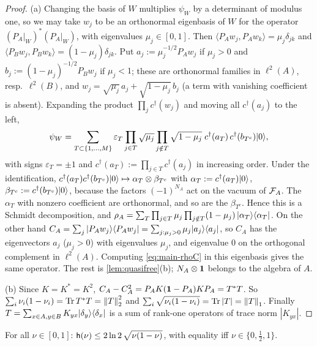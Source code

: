 \begin{proof}
(a) Changing the basis of $W$ multiplies $\psi_W$ by a determinant of modulus one, so we may take $w_j$ to be
an orthonormal eigenbasis of $W$ for the operator $(P_A|_W)^*(P_A|_W)$, with eigenvalues
$\mu_j\in[0,1]$.  Then $\langle P_Aw_j,P_Aw_k\rangle=\mu_j\delta_{jk}$ and
$\langle P_Bw_j,P_Bw_k\rangle=(1-\mu_j)\delta_{jk}$.  Put $a_j:=\mu_j^{-1/2}P_Aw_j$ if $\mu_j>0$ and
$b_j:=(1-\mu_j)^{-1/2}P_Bw_j$ if $\mu_j<1$; these are orthonormal families in $\ell^2(A)$, resp.\ $\ell^2(B)$,
and $w_j=\sqrt{\mu_j}\,a_j+\sqrt{1-\mu_j}\,b_j$ (a term with vanishing coefficient is absent).  Expanding
the product $\prod_jc^\dagger(w_j)$ and moving all $c^\dagger(a_j)$ to the left,
\[
  \psi_W=\sum_{T\subset\{1,\dots,M\}}\varepsilon_T\prod_{j\in T}\sqrt{\mu_j}\prod_{j\notin T}\sqrt{1-\mu_j}\;
  c^\dagger(a_T)\,c^\dagger(b_{T^c})|0\rangle,
\]
with signs $\varepsilon_T=\pm1$ and $c^\dagger(a_T):=\prod_{j\in T}c^\dagger(a_j)$ in increasing order.  Under the
identification, $c^\dagger(a_T)c^\dagger(b_{T^c})|0\rangle\mapsto\alpha_T\otimes\beta_{T^c}$ with
$\alpha_T:=c^\dagger(a_T)|0\rangle$, $\beta_{T^c}:=c^\dagger(b_{T^c})|0\rangle$, because the factors $(-1)^{N_A}$ act on the
vacuum of $\mathcal{F}_A$.  The $\alpha_T$ with nonzero coefficient are orthonormal, and so are the $\beta_{T^c}$.  Hence
this is a Schmidt decomposition, and
$\rho_A=\sum_T\prod_{j\in T}\mu_j\prod_{j\notin T}(1-\mu_j)\,|\alpha_T\rangle\langle \alpha_T|$.  On the other hand
$C_A=\sum_j|P_Aw_j\rangle\langle P_Aw_j|=\sum_{j:\mu_j>0}\mu_j|a_j\rangle\langle a_j|$, so $C_A$ has the eigenvectors
$a_j$ ($\mu_j>0$) with eigenvalues $\mu_j$, and eigenvalue $0$ on the orthogonal complement in $\ell^2(A)$.
Computing \eqref{eq:main-rhoC} in this eigenbasis gives the same operator.  The rest is
\cref{lem:quasifree}(b); $N_A\otimes\mathbf{1}$ belongs to the algebra of $A$.

(b) Since $K=K^*=K^2$, $C_A-C_A^2=P_AK(\mathbf{1}-P_A)KP_A=T^*T$.  So
$\sum_i\nu_i(1-\nu_i)=\operatorname{Tr} T^*T=\left\|T\right\|_2^2$ and $\sum_i\sqrt{\nu_i(1-\nu_i)}=\operatorname{Tr}|T|=\left\|T\right\|_1$.  Finally
$T=\sum_{x\in A,y\in B}K_{yx}|\delta_y\rangle\langle \delta_x|$ is a sum of rank-one operators of trace norm
$|K_{yx}|$.
\end{proof}

\begin{lemma}\label{lem:binent}
For all $\nu\in[0,1]$: $\mathsf{h}(\nu)\le2\ln2\,\sqrt{\nu(1-\nu)}$, with equality iff $\nu\in\{0,\tfrac12,1\}$.
\end{lemma}

